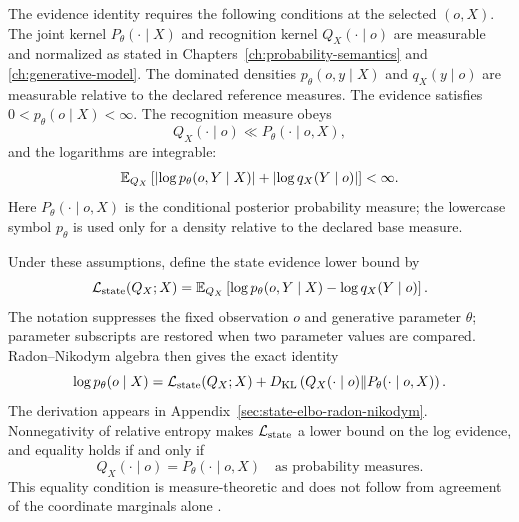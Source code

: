 The evidence identity requires the following conditions at the selected \((o,X)\). The joint kernel \(P_\theta(\mathord\cdot\mid X)\) and recognition kernel \(Q_X(\mathord\cdot\mid o)\) are measurable and normalized as stated in Chapters~\ref{ch:probability-semantics} and \ref{ch:generative-model}. The dominated densities \(p_\theta(o,y\mid X)\) and \(q_X(y\mid o)\) are measurable relative to the declared reference measures. The evidence satisfies \(0<p_\theta(o\mid X)<\infty\). The recognition measure obeys
\begin{equation}
Q_X(\mathord\cdot\mid o)
\ll P_\theta(\mathord\cdot\mid o,X),
\label{eq:recognition-posterior-absolute-continuity}
\end{equation}
and the logarithms are integrable:
\begin{equation}
\mathbb E_{Q_X}\left[
\left|\log p_\theta(o,Y\mid X)\right|
+\left|\log q_X(Y\mid o)\right|
\right]<\infty.
\label{eq:state-elbo-log-integrability}
\end{equation}
Here \(P_\theta(\mathord\cdot\mid o,X)\) is the conditional posterior probability measure; the lowercase symbol \(p_\theta\) is used only for a density relative to the declared base measure.

Under these assumptions, define the state evidence lower bound by
\begin{equation}
\mathcal L_{\mathrm{state}}(Q_X;X)
=\mathbb E_{Q_X}\left[
\log p_\theta(o,Y\mid X)-\log q_X(Y\mid o)
\right].
\label{eq:state-elbo-definition}
\end{equation}
The notation suppresses the fixed observation \(o\) and generative parameter \(\theta\); parameter subscripts are restored when two parameter values are compared.
Radon--Nikodym algebra then gives the exact identity
\begin{equation}
\log p_\theta(o\mid X)
=\mathcal L_{\mathrm{state}}(Q_X;X)
+D_{\mathrm{KL}}\left(
Q_X(\mathord\cdot\mid o)
\middle\Vert
P_\theta(\mathord\cdot\mid o,X)
\right).
\label{eq:state-evidence-identity}
\end{equation}
The derivation appears in Appendix~\ref{sec:state-elbo-radon-nikodym}. Nonnegativity of relative entropy makes \(\mathcal L_{\mathrm{state}}\) a lower bound on the log evidence, and equality holds if and only if
\begin{equation}
Q_X(\mathord\cdot\mid o)
=P_\theta(\mathord\cdot\mid o,X)
\quad\text{as probability measures}.
\label{eq:state-elbo-equality-condition}
\end{equation}
This equality condition is measure-theoretic and does not follow from agreement of the coordinate marginals alone \citep{Kullback1951,Csiszar1967}.

